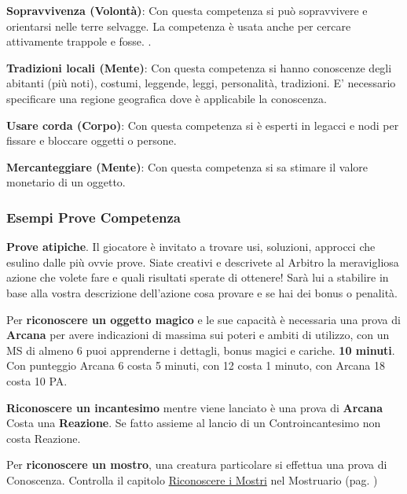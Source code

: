 \documentclass[12pt,a4paper,twoside,openany]{book}
\begin{document}
\begin{multicols}{2}
\textbf{Sopravvivenza (Volontà)}: Con questa competenza si può sopravvivere e orientarsi nelle terre selvagge. La competenza è usata anche per cercare attivamente trappole e fosse. .

\textbf{Tradizioni locali (Mente)}: Con questa competenza si hanno conoscenze degli abitanti (più noti), costumi, leggende, leggi, personalità, tradizioni. E' necessario specificare una regione geografica dove è applicabile la conoscenza. 

\textbf{Usare corda (Corpo)}: Con questa competenza si è esperti in legacci e nodi per fissare e bloccare oggetti o persone. 

\textbf{Mercanteggiare (Mente)}: Con questa competenza si sa stimare il valore monetario di un oggetto.

\subsubsection{Esempi Prove Competenza}\label{esempiprovecompetenza}\hypertarget{esempiprovecompetenze}{}

\textbf{Prove atipiche}. Il giocatore è invitato a trovare usi, soluzioni, approcci che esulino dalle più ovvie prove. Siate creativi e descrivete al Arbitro la meravigliosa azione che volete fare e quali risultati sperate di ottenere! Sarà lui a stabilire in base alla vostra descrizione dell'azione cosa provare e se hai dei bonus o penalità.

\medskip

Per \textbf{riconoscere un oggetto magico} e le sue capacità è necessaria una prova di \textbf{Arcana} per avere indicazioni di massima sui poteri e ambiti di utilizzo, con un MS di almeno 6 puoi apprenderne i dettagli, bonus magici e cariche. \textbf{10 minuti}. Con punteggio Arcana 6 costa 5 minuti, con 12 costa 1 minuto, con Arcana 18 costa 10 PA.

\medskip

\textbf{Riconoscere un incantesimo} mentre viene lanciato è una prova di \textbf{Arcana} Costa una \textbf{Reazione}. Se fatto assieme al lancio di un Controincantesimo non costa Reazione.

\medskip

Per \textbf{riconoscere un mostro}, una creatura particolare si effettua una prova di Conoscenza. Controlla il capitolo \hyperlink{riconoscereimostri}{Riconoscere i Mostri} nel Mostruario (pag. \pageref{riconoscereimostri})


\end{multicols}
\end{document}
